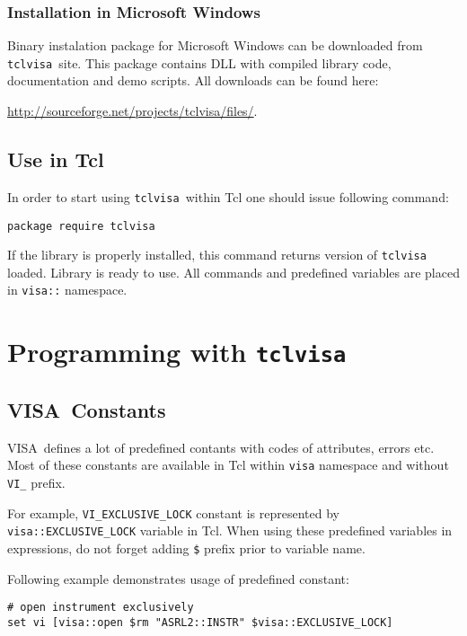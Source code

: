 \documentclass[12pt, a4paper]{report}
\newcommand{\tclvisa}{{\tt tclvisa }}
\newcommand{\VISA}{\mbox{VISA }}
\begin{document}
\subsection{Installation in Microsoft Windows}

Binary instalation package for Microsoft Windows can be downloaded from \tclvisa site. This package contains DLL with compiled library code, documentation and demo scripts. All downloads can be found here: 

\href{http://sourceforge.net/projects/tclvisa/files/}{http://sourceforge.net/projects/tclvisa/files/}.

\section{Use in Tcl}

In order to start using \tclvisa within Tcl one should issue following command:

\begin{verbatim} 
package require tclvisa
\end{verbatim} 

If the library is properly installed, this command returns version of \tclvisa loaded. Library is ready to use. All commands and predefined variables are placed in {\tt visa::} namespace.

\chapter{Programming with \tclvisa}

\section{\VISA Constants}

\VISA defines a lot of predefined contants with codes of attributes, errors etc. Most of these constants are available in Tcl within {\tt visa} namespace and without {\tt VI\_} prefix.

For example, {\tt VI\_EXCLUSIVE\_LOCK} constant is represented by \\{\tt visa::EXCLUSIVE\_LOCK} variable in Tcl. When using these predefined variables in expressions, do not forget adding {\tt \$} prefix prior to variable name.

Following example demonstrates usage of predefined constant:

\begin{verbatim} 
# open instrument exclusively
set vi [visa::open $rm "ASRL2::INSTR" $visa::EXCLUSIVE_LOCK]
\end{verbatim} 
\end{document}
